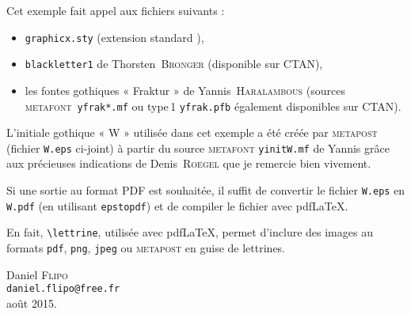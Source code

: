 \documentclass[12pt,a4paper,german,french]{article}
\newcommand{\MF}{{\small\sffamily\scshape metafont}}
\newcommand{\MP}{{\small\sffamily\scshape metapost}}
\begin{document}
Cet exemple fait appel aux fichiers suivants :
\begin{itemize}
\item \verb+graphicx.sty+ (extension standard \LaTeXe{}),
\item \verb+blackletter1+ de Thorsten~\textsc{Bronger} (disponible sur CTAN),
\item les fontes gothiques « Fraktur » de Yannis~\textsc{Haralambous}
  (sources \MF{}~\verb+yfrak*.mf+ ou type\,1 \verb+yfrak.pfb+ également
  disponibles sur CTAN).
\end{itemize}
L'initiale gothique « W » utilisée dans
cet exemple a été créée par \MP{} (fichier \verb+W.eps+ ci-joint)
à partir du source \MF{} \verb+yinitW.mf+ de Yannis grâce aux précieuses
indications de Denis~\textsc{Roegel} que je remercie bien vivement.

Si une sortie au format PDF est souhaitée, il suffit de convertir
le fichier \verb+W.eps+ en \verb+W.pdf+ (en utilisant \verb+epstopdf+) et
de compiler le fichier avec pdf\LaTeX.

En fait, \verb+\lettrine+, utilisée avec pdf\LaTeX, permet d'inclure
des images au formats \texttt{pdf}, \texttt{png}, \texttt{jpeg} ou \MP{} en
guise de lettrines.

\vfill
\begin{flushright}
  Daniel \textsc{Flipo}\\
  \texttt{daniel.flipo@free.fr}\\
  août 2015.
\end{flushright}
\end{document}
